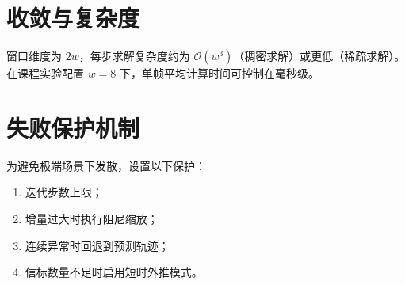 \section{收敛与复杂度}
窗口维度为 $2w$，每步求解复杂度约为 $\mathcal O(w^3)$（稠密求解）或更低（稀疏求解）。在课程实验配置 $w=8$ 下，单帧平均计算时间可控制在毫秒级。

\section{失败保护机制}
为避免极端场景下发散，设置以下保护：
\begin{enumerate}
  \item 迭代步数上限；
  \item 增量过大时执行阻尼缩放；
  \item 连续异常时回退到预测轨迹；
  \item 信标数量不足时启用短时外推模式。
\end{enumerate}
